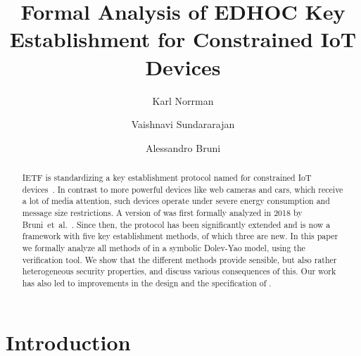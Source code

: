 \documentclass[runningheads, envcountsame, a4paper, draft, x11names]{llncs}
\newcommand{\fillhack}{\vspace{-0.5em}}
\begin{document}
\title{Formal Analysis of EDHOC Key Establishment for Constrained IoT Devices}
\author{Karl Norrman \and
Vaishnavi Sundararajan \and
Alessandro Bruni
}
%
%
%
\maketitle
%

\begin{abstract}
IETF is standardizing a key establishment protocol named \mEdhoc{} for
constrained IoT devices~\cite{selander-lake-edhoc-01}.
%
In contrast to more powerful devices like web cameras and cars, which receive a
lot of media attention, such devices operate under severe energy consumption
and message size restrictions.
%
A version of \mEdhoc{} was first formally analyzed in 2018 by
Bruni~et~al.~\cite{DBLP:conf/secsr/BruniJPS18}.
%
Since then, the protocol has been significantly extended and is now a
framework with five key establishment methods, of which three are new.
%
In this paper we formally analyze all methods of \mEdhoc{} in a symbolic
Dolev-Yao model, using the \mTamarin{} verification tool.
%
We show that the different methods provide sensible, but also rather
heterogeneous security properties, and discuss various consequences of this.
%
Our work has also led to improvements in the design and the specification of
\mEdhoc.
%
\end{abstract}
%

\vspace{-2.5em}
\section{Introduction}
\label{sec:introduction}
\fillhack
\end{document}
